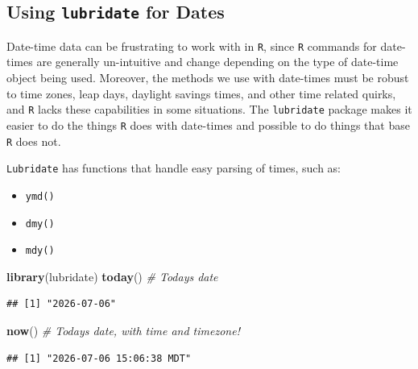\documentclass[
  10pt,
  letterpaper,
  twoside,
  openright]{book}
\newenvironment{Shaded}{\begin{snugshade}}{\end{snugshade}}
\newcommand{\CommentTok}[1]{\textcolor[rgb]{0.56,0.35,0.01}{\textit{#1}}}
\newcommand{\FunctionTok}[1]{\textcolor[rgb]{0.13,0.29,0.53}{\textbf{#1}}}
\newcommand{\NormalTok}[1]{#1}
\providecommand{\tightlist}{%
  \setlength{\itemsep}{0pt}\setlength{\parskip}{0pt}}
\begin{document}
\hypertarget{using-lubridate-for-dates}{%
\subsection{\texorpdfstring{Using \texttt{lubridate} for
Dates}{Using lubridate for Dates}}\label{using-lubridate-for-dates}}

Date-time data can be frustrating to work with in \texttt{R}, since
\texttt{R} commands for date-times are generally un-intuitive and change
depending on the type of date-time object being used. Moreover, the
methods we use with date-times must be robust to time zones, leap days,
daylight savings times, and other time related quirks, and \texttt{R}
lacks these capabilities in some situations. The \texttt{lubridate}
package makes it easier to do the things \texttt{R} does with date-times
and possible to do things that base \texttt{R} does not.

\texttt{Lubridate} has functions that handle easy parsing of times, such
as:

\begin{itemize}
\tightlist
\item
  \texttt{ymd()}
\item
  \texttt{dmy()}
\item
  \texttt{mdy()}
\end{itemize}

\begin{Shaded}
\begin{Highlighting}[]
\FunctionTok{library}\NormalTok{(lubridate)}
\FunctionTok{today}\NormalTok{() }\CommentTok{\# Today\textquotesingle{}s date}
\end{Highlighting}
\end{Shaded}

\begin{verbatim}
## [1] "2026-07-06"
\end{verbatim}

\begin{Shaded}
\begin{Highlighting}[]
\FunctionTok{now}\NormalTok{() }\CommentTok{\# Today\textquotesingle{}s date, with time and timezone!}
\end{Highlighting}
\end{Shaded}

\begin{verbatim}
## [1] "2026-07-06 15:06:38 MDT"
\end{verbatim}
\end{document}
